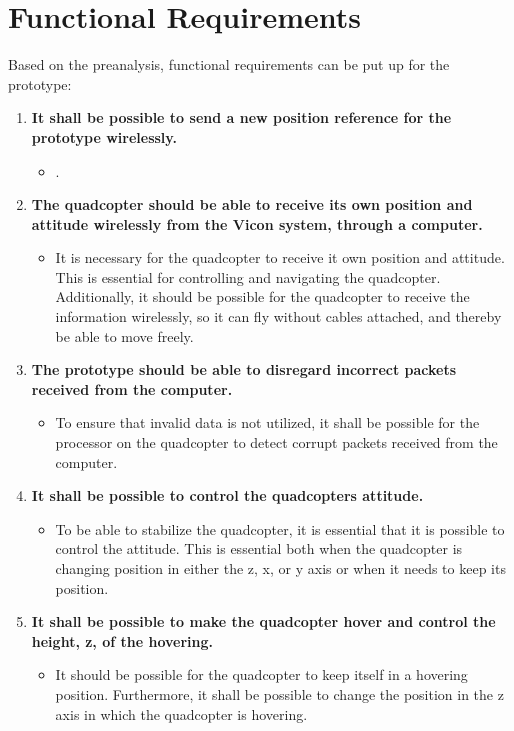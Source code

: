\chapter{Functional Requirements}
\label{ch:functionalRequirements}
Based on the preanalysis, functional requirements can be put up for the prototype:

\begin{enumerate}[label=\textbf{\arabic*})]
\item \textbf{It shall be possible to send a new position reference for the prototype wirelessly.}
\begin{itemize}
\item[] .
\end{itemize}

\item \textbf{The quadcopter should be able to receive its own position and attitude wirelessly from the Vicon system, through a computer.}
\begin{itemize}
\item[] It is necessary for the quadcopter to receive it own position and attitude. This is essential for controlling and navigating the quadcopter. Additionally, it should be possible for the quadcopter to receive the information wirelessly, so it can fly without cables attached, and thereby be able to move freely.
\end{itemize}

\item \textbf{The prototype should be able to disregard incorrect packets received from the computer.}
\begin{itemize}
\item[] To ensure that invalid data is not utilized, it shall be possible for the processor on the quadcopter to detect corrupt packets received from the computer.
\end{itemize}

\item \textbf{It shall be possible to control the quadcopters attitude.}
\begin{itemize}
\item[] To be able to stabilize the quadcopter, it is essential that it is possible to control the attitude. This is essential both when the quadcopter is changing position in either the z, x, or y axis or when it needs to keep its position.
\end{itemize}

\item \textbf{It shall be possible to make the quadcopter hover and control the height, z, of the hovering.}
\begin{itemize}
\item[] It should be possible for the quadcopter to keep itself in a hovering position. Furthermore, it shall be possible to change the position in the z axis in which the quadcopter is hovering.
\end{itemize}


\end{enumerate}
